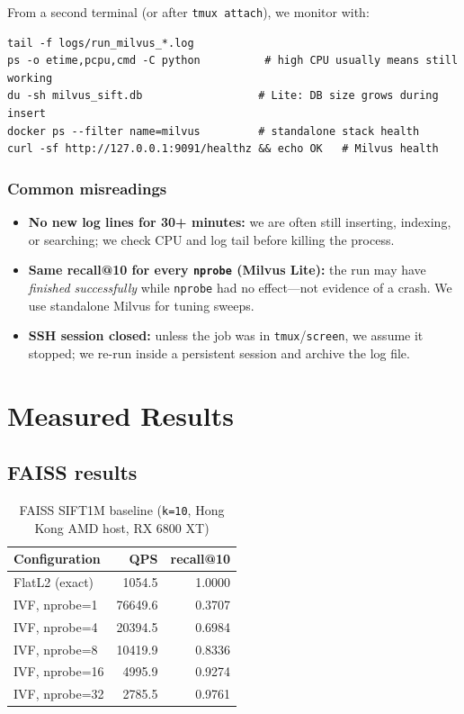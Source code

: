 \documentclass[11pt,a4paper]{article}
\begin{document}
From a second terminal (or after \texttt{tmux attach}), we monitor with:
\begin{verbatim}
tail -f logs/run_milvus_*.log
ps -o etime,pcpu,cmd -C python          # high CPU usually means still working
du -sh milvus_sift.db                  # Lite: DB size grows during insert
docker ps --filter name=milvus         # standalone stack health
curl -sf http://127.0.0.1:9091/healthz && echo OK   # Milvus health
\end{verbatim}

\subsubsection*{Common misreadings}

\begin{itemize}[leftmargin=*]
  \item \textbf{No new log lines for 30+ minutes:} we are often still inserting, indexing, or
        searching; we check CPU and log tail before killing the process.
  \item \textbf{Same recall@10 for every \texttt{nprobe} (Milvus Lite):} the run may
        have \emph{finished successfully} while \texttt{nprobe} had no effect---not
        evidence of a crash. We use standalone Milvus for tuning sweeps.
  \item \textbf{SSH session closed:} unless the job was in \texttt{tmux}/\texttt{screen},
        we assume it stopped; we re-run inside a persistent session and archive the log file.
\end{itemize}

\section{Measured Results}

\subsection{FAISS results}

\begin{table}[h]
\centering
\caption{FAISS SIFT1M baseline (\texttt{k=10}, Hong Kong AMD host, RX 6800 XT)}
\begin{tabular}{@{}lrr@{}}
\toprule
\textbf{Configuration} & \textbf{QPS} & \textbf{recall@10} \\
\midrule
FlatL2 (exact)   & 1054.5  & 1.0000 \\
IVF, nprobe=1    & 76649.6 & 0.3707 \\
IVF, nprobe=4    & 20394.5 & 0.6984 \\
IVF, nprobe=8    & 10419.9 & 0.8336 \\
IVF, nprobe=16   & 4995.9  & 0.9274 \\
IVF, nprobe=32   & 2785.5  & 0.9761 \\
\bottomrule
\end{tabular}
\end{table}
\end{document}
